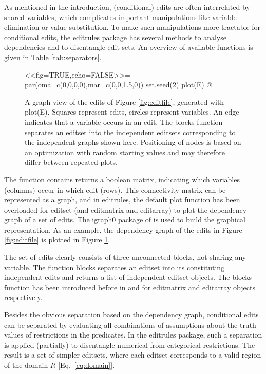 \documentclass[11pt,fleqn,a4paper]{article}
\begin{document}
As mentioned in the introduction, (conditional) edits are often interrelated by
shared variables, which complicates important manipulations like variable
elimination or value substitution. To make such manipulations more tractable
for conditional edits, the {\sf editrules} package has several methods to
analyse dependencies and to disentangle edit sets. An overview of available
functions is given in Table \ref{tab:separators}.
%
\begin{figure}[t]
<<fig=TRUE,echo=FALSE>>=
par(oma=c(0,0,0,0),mar=c(0,0,1.5,0))
set.seed(2)
plot(E)
@
\caption{A graph view of the edits of Figure \ref{fig:editfile}, generated  with
{\sf plot(E)}.  Squares represent edits, circles represent variables. An edge
indicates that a variable occurs in an edit. The {\sf blocks} function
separates an {\sf editset} into the independent editsets corresponding to the
independent graphs shown here. Positioning of nodes is based on an optimization
with random starting values and may therefore differ between repeated plots.
}
\label{fig:graph}
\end{figure}
%

The function {\sf contains} returns a boolean matrix, indicating which
variables (columns) occur in which edit (rows). This connectivity matrix can be
represented as a graph, and in {\sf editrules}, the default {\sf plot} function
has been overloaded for {\sf editset} (and {\sf editmatrix} and {\sf
editarray}) to plot the dependency graph of a set of edits. The {\sf igraph0} package
of \cite{csardi:2006} is used to build the graphical representation. As an example,
the dependency graph of the edits in Figure \ref{fig:editfile} is plotted in
Figure \ref{fig:graph}.


The set of edits clearly consists of three unconnected blocks, not sharing any
variable.  The function {\sf blocks} separates an {\sf editset} into its
constituting independent edits and returns a {\sf list} of independent {\sf
editset} objects. The {\sf blocks} function has been introduced before in
\cite{jonge:2011} and \cite{loo:2011b} for {\sf editmatrix} and {\sf editarray}
objects respectively.

Besides the obvious separation based on the dependency graph, conditional edits
can be separated by evaluating all combinations of assumptions about the truth
values of restrictions in the predicates. In the editrules package, such a
separation is applied (partially) to disentangle numerical from categorical
restrictions. The result is a set of simpler {\sf editset}s, where each {\sf
editset} corresponds to a valid region of the domain $R$ [Eq.\
\eqref{eq:domain}].
\end{document}
